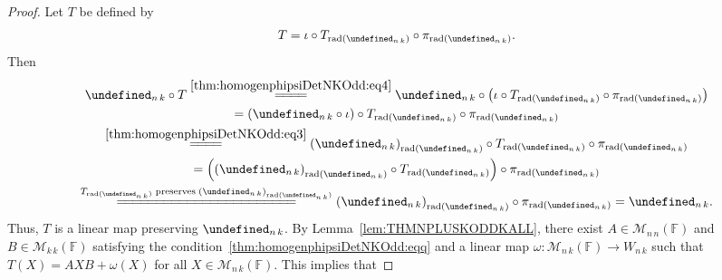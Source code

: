 \documentclass{elsarticle}
\let\det\undefined
\DeclareMathOperator{\det}{det}
\DeclareMathOperator{\rad}{rad}
\def\F{{\mathbb F}}
\def\M{{\mathcal M}}
\theoremstyle{definition}
\numberwithin{equation}{section}
\begin{document}
\begin{proof}
Let $T$ be defined by 
\begin{equation}\label{thm:homogenphipsiDetNKOdd:eq4}
T = \iota \circ T_{\rad (\det_{n\,k})} \circ \pi_{\rad (\det_{n\,k})}.
\end{equation}
Then
\begin{multline*}\label{thm:homogenphipsiDetNKOdd:eq5}
\det_{n\,k} \circ T \overset{\eqref{thm:homogenphipsiDetNKOdd:eq4}}{=\joinrel=\joinrel=\joinrel=} \det_{n\,k} \circ \left(\iota \circ T_{\rad (\det_{n\,k})} \circ \pi_{\rad (\det_{n\,k})}\right)\\
= \left(\det_{n\,k} \circ \iota\right) \circ T_{\rad (\det_{n\,k})} \circ \pi_{\rad (\det_{n\,k})}\\
\overset{\eqref{thm:homogenphipsiDetNKOdd:eq3}}{=\joinrel=\joinrel=\joinrel=} \left(\det_{n\,k}\right)_{\rad (\det_{n\,k})} \circ T_{\rad (\det_{n\,k})} \circ \pi_{\rad (\det_{n\,k})}\\
 = \left(\left(\det_{n\,k}\right)_{\rad (\det_{n\,k})} \circ T_{\rad (\det_{n\,k})}\right) \circ \pi_{\rad (\det_{n\,k})}\\
 \overset{\scriptsize T_{\rad (\det_{n\,k})}\;\mbox{preserves}\;\left(\det_{n\,k}\right)_{\rad (\det_{n\,k})}}{=\joinrel=\joinrel=\joinrel=\joinrel=\joinrel=\joinrel=\joinrel=\joinrel=\joinrel=\joinrel=\joinrel=\joinrel=\joinrel=\joinrel=\joinrel=\joinrel=\joinrel=\joinrel=\joinrel=\joinrel=\joinrel=\joinrel=} \left(\det_{n\,k}\right)_{\rad (\det_{n\,k})} \circ \pi_{\rad (\det_{n\,k})} = \det_{n\,k}.
\end{multline*}
Thus, $T$ is a linear map preserving $\det_{n\,k}$. By Lemma~\ref{lem:THMNPLUSKODDKALL}, there exist $A \in \M_{n\, n}(\F)$ and $B \in \M_{k\, k}(\F)$ satisfying the condition~\eqref{thm:homogenphipsiDetNKOdd:eqq} and a linear map $\omega \colon \M_{n\,k}(\F) \to W_{n\,k}$ such that $T(X) = AXB + \omega(X)$ for all $X \in \M_{n\,k}(\F)$. This implies that


\end{proof}
\end{document}
